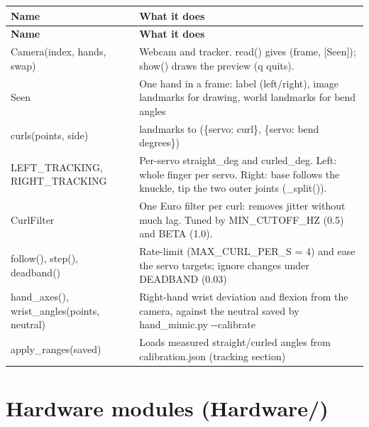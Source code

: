 \documentclass[11pt,letterpaper]{article}
\newcommand{\code}[1]{\textcolor{codeblue}{\ttfamily\smaller\relax #1}}
\begin{document}
{\small
\begin{longtable}{|>{\raggedright\arraybackslash}p{}|>{\raggedright\arraybackslash}p{}|}
\hline
\rowcolor{tblhead}\textbf{Name} & \textbf{What it does} \\ \hline
\endfirsthead
\hline
\rowcolor{tblhead}\textbf{Name} & \textbf{What it does} \\ \hline
\endhead
\code{Camera(index,\allowbreak{} hands,\allowbreak{} swap)} & Webcam and tracker. \code{read()} gives \code{(frame,\allowbreak{} [Seen])}; \code{show()} draws the preview (\code{q} quits). \\ \hline
\code{Seen} & One hand in a frame: label (left/right), image landmarks for drawing, world landmarks for bend angles \\ \hline
\code{curls(points,\allowbreak{} side)} & 21 landmarks to \code{(\{servo: curl\},\allowbreak{} \{servo: bend degrees\})} \\ \hline
\code{LEFT\_\allowbreak{}TRACKING}, \code{RIGHT\_\allowbreak{}TRACKING} & Per-servo \code{straight\_\allowbreak{}deg} and \code{curled\_\allowbreak{}deg}. Left: whole finger per servo. Right: base follows the knuckle, tip the two outer joints (\code{\_\allowbreak{}split()}). \\ \hline
\code{CurlFilter} & One Euro filter per curl: removes jitter without much lag. Tuned by \code{MIN\_\allowbreak{}CUTOFF\_\allowbreak{}HZ} (0.5) and \code{BETA} (1.0). \\ \hline
\code{follow()}, \code{step()}, \code{deadband()} & Rate-limit (\code{MAX\_\allowbreak{}CURL\_\allowbreak{}PER\_\allowbreak{}S} = 4) and ease the servo targets; ignore changes under \code{DEADBAND} (0.03) \\ \hline
\code{hand\_\allowbreak{}axes()}, \code{wrist\_\allowbreak{}angles(points,\allowbreak{} neutral)} & Right-hand wrist deviation and flexion from the camera, against the neutral saved by \code{hand\_\allowbreak{}mimic.py -{}-{}calibrate} \\ \hline
\code{apply\_\allowbreak{}ranges(saved)} & Loads measured straight/curled angles from \code{calibration.json} (\code{tracking} section) \\ \hline
\end{longtable}}


\section{Hardware modules (Hardware/)}
\end{document}
